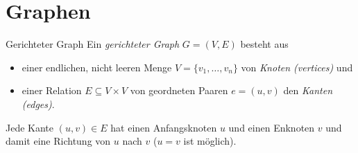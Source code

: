 \section{Graphen}

\begin{defi}{Gerichteter Graph}
    Ein \emph{gerichteter Graph} $G = (V, E)$ besteht aus
    \begin{itemize}
        \item einer endlichen, nicht leeren Menge $V = \{v_1, \ldots, v_n\}$ von \emph{Knoten (vertices)} und
        \item einer Relation $E \subseteq V \times V$ von geordneten Paaren $e = (u, v)$ den \emph{Kanten (edges)}.
    \end{itemize}

    Jede Kante $(u,v) \in E$ hat einen Anfangsknoten $u$ und einen Enknoten $v$ und damit eine Richtung von $u$ nach $v$ ($u=v$ ist möglich).

    \begin{center}
    \end{center}
\end{defi}

